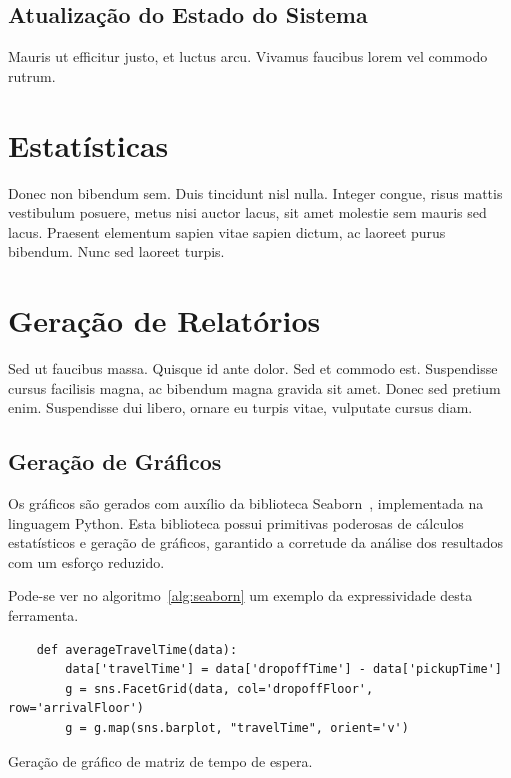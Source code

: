 \subsection{Atualização do Estado do Sistema}

Mauris ut efficitur justo, et luctus arcu. Vivamus faucibus lorem vel commodo
rutrum.

\section{Estatísticas}

Donec non bibendum sem. Duis tincidunt nisl nulla. Integer congue, risus mattis
vestibulum posuere, metus nisi auctor lacus, sit amet molestie sem mauris sed
lacus. Praesent elementum sapien vitae sapien dictum, ac laoreet purus bibendum.
Nunc sed laoreet turpis.

\section{Geração de Relatórios}

Sed ut faucibus massa. Quisque id ante dolor. Sed et commodo est. Suspendisse
cursus facilisis magna, ac bibendum magna gravida sit amet. Donec sed pretium
enim. Suspendisse dui libero, ornare eu turpis vitae, vulputate cursus diam.

\subsection{Geração de Gráficos}

Os gráficos são gerados com auxílio da biblioteca Seaborn~\cite{seaborn},
implementada na linguagem Python. Esta biblioteca possui primitivas poderosas de
cálculos estatísticos e geração de gráficos, garantido a corretude da análise
dos resultados com um esforço reduzido.

Pode-se ver no algoritmo~\ref{alg:seaborn} um exemplo da expressividade desta
ferramenta.

\begin{algorithm}[htb]
  \centering
    \begin{verbatim}
    def averageTravelTime(data):
        data['travelTime'] = data['dropoffTime'] - data['pickupTime']
        g = sns.FacetGrid(data, col='dropoffFloor', row='arrivalFloor')
        g = g.map(sns.barplot, "travelTime", orient='v')
    \end{verbatim}
  \caption{Geração de gráfico de matriz de tempo de espera.}
  \label{alg:seaborn}
\end{algorithm}

